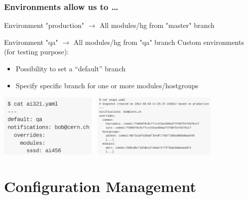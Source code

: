 \documentclass[aspectratio=169]{beamer}
\begin{document}
\begin{frame}

    \frametitle{Environments allow us to \ldots}

    Environment "production"
        $\rightarrow$ All modules/hg from "master" branch

    Environment "qa"
        $\rightarrow$ All modules/hg from "qa" branch
    \newline 
    \newline 
    Custom environments (for testing purpose):
    \begin{itemize}
        \item Possibility to set a “default” branch
        \item Specify specific branch for one or more modules/hostgroups
    \end{itemize}
    \begin{center}
        \includegraphics[width=0.35\textwidth]{Env_example.png} \,
        \includegraphics[width=0.45\textwidth]{Env_example_commit.png}
    \end{center}

\end{frame}

\section{Configuration Management}
\end{document}
